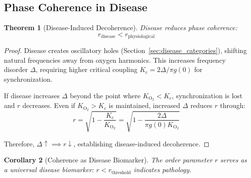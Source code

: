 \documentclass[11pt,twocolumn,a4paper]{article}
\newtheorem{theorem}{Theorem}[section]
\newtheorem{corollary}[theorem]{Corollary}
\theoremstyle{definition}
\theoremstyle{remark}
\begin{document}
\subsection{Phase Coherence in Disease}

\begin{theorem}[Disease-Induced Decoherence]
\label{thm:disease_decoherence}
Disease reduces phase coherence:
\begin{equation}
r_{\mathrm{disease}} < r_{\mathrm{physiological}}
\label{eq:disease_decoherence}
\end{equation}
\end{theorem}

\begin{proof}
Disease creates oscillatory holes (Section~\ref{sec:disease_categories}), shifting natural frequencies away from oxygen harmonics. This increases frequency disorder $\Delta$, requiring higher critical coupling $K_c = 2\Delta/\pi g(0)$ for synchronization.

If disease increases $\Delta$ beyond the point where $K_{\mathrm{O_2}} < K_c$, synchronization is lost and $r$ decreases. Even if $K_{\mathrm{O_2}} > K_c$ is maintained, increased $\Delta$ reduces $r$ through:
\begin{equation}
r = \sqrt{1 - \frac{K_c}{K_{\mathrm{O_2}}}} = \sqrt{1 - \frac{2\Delta}{\pi g(0) K_{\mathrm{O_2}}}}
\label{eq:order_parameter_formula}
\end{equation}

Therefore, $\Delta \uparrow \implies r \downarrow$, establishing disease-induced decoherence.
\end{proof}

\begin{corollary}[Coherence as Disease Biomarker]
\label{cor:coherence_biomarker}
The order parameter $r$ serves as a universal disease biomarker: $r < r_{\mathrm{threshold}}$ indicates pathology.
\end{corollary}
\end{document}

